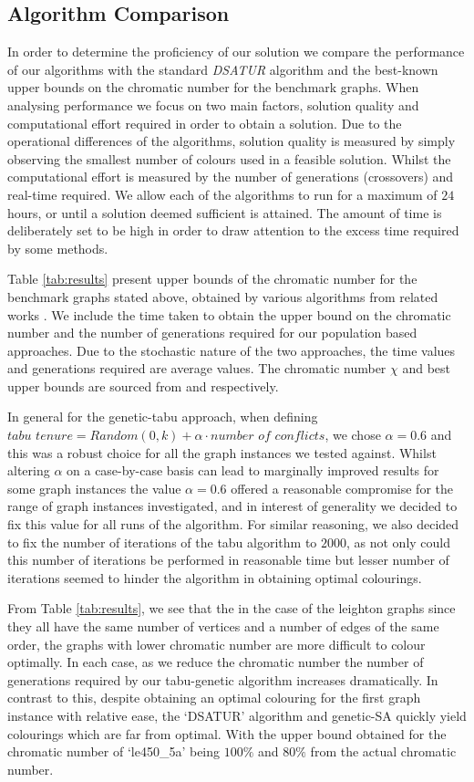 \documentclass[12pt,a4paper]{article}
\begin{document}
\subsection*{Algorithm Comparison}
In order to determine the proficiency of our solution we compare the performance of our algorithms with the standard \textit{DSATUR} algorithm and the best-known upper bounds on the chromatic number for the benchmark graphs. When analysing performance we focus on two main factors, solution quality and computational effort required in order to obtain a solution. Due to the operational differences of the algorithms, solution quality is measured by simply observing the smallest number of colours used in a feasible solution. Whilst the computational effort is measured by the number of generations (crossovers) and real-time required. We allow each of the algorithms to run for a maximum of $24$ hours, or until a solution deemed sufficient is attained. The amount of time is deliberately set to be high in order to draw attention to the excess time required by some methods.
\par Table \ref{tab:results} present upper bounds of the chromatic number for the benchmark graphs stated above, obtained by various algorithms from related works \cite{Johnson}. We include the time taken to obtain the upper bound on the chromatic number and the number of generations required for our population based approaches. Due to the stochastic nature of the two approaches, the time values and generations required are average values. The chromatic number $\chi$ and best upper bounds are sourced from  \cite{Sousa} and \cite{Johnson} respectively.
\par In general for the genetic-tabu approach, when defining $\textit{tabu tenure} = Random(0, k) + \alpha \cdot \textit{number of conflicts}$, we chose $\alpha = 0.6$  and this was a robust choice for all the graph instances we tested against. Whilst altering $\alpha$ on a case-by-case basis can lead to marginally improved results for some graph instances the value $\alpha = 0.6$ offered a reasonable compromise for the range of graph instances investigated, and in interest of generality we decided to fix this value for all runs of the algorithm. For similar reasoning, we also decided to fix the number of iterations of the tabu algorithm to $2000$, as not only could this number of iterations be performed in reasonable time but lesser number of iterations seemed to hinder the algorithm in obtaining optimal colourings.


\par From Table \ref{tab:results}, we see that the in the case of the leighton graphs since they all have the same number of vertices and a number of edges of the same order, the graphs with lower chromatic number are more difficult to colour optimally. In each case, as we reduce the chromatic number the number of generations required by our tabu-genetic algorithm increases dramatically. In contrast to this, despite obtaining an optimal colouring for the first graph instance with relative ease, the `DSATUR' algorithm \cite{Brelaz}  and genetic-SA quickly yield colourings which are far from optimal. With the upper bound obtained for the chromatic number of `le450\_5a' being $100\%$ and $80\%$ from the actual chromatic number.
\end{document}
